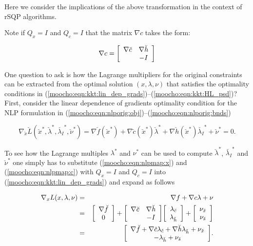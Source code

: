 \documentclass[pdf,ps2pdf,11pt]{SANDreport}
\begin{document}
{Here we consider the implications of the above transformation in the context of
rSQP algorithms.

Note if $Q_x = I$ and $Q_c = I$ that the matrix $\nabla c$ takes the form:

\begin{equation}
\nabla c = {\bmat{cc} \nabla \breve{c} & \nabla \breve{h} \\ & -I \emat}
	\label{moocho:eqn:Gc_orig}
\end{equation}

One question to ask is how the Lagrange multipliers for
the original constraints can be extracted from the optimal solution
$(x,\lambda,\nu)$ that satisfies the optimality conditions
in (\ref{moocho:eqn:kkt:lin_dep_grads})--(\ref{moocho:eqn:kkt:HL_psd})?
First, consider the linear dependence of gradients optimality condition
for the NLP formulation in (\ref{moocho:eqn:nlporig:obj})--(\ref{moocho:eqn:nlporig:bnds})

\begin{equation}
\nabla_{\breve{x}} \breve{L}(\breve{x}^*,\breve{\lambda}^*,\breve{\lambda_I}^*,\breve{\nu}^*)
= \nabla \breve{f}(\breve{x}^*) + \nabla \breve{c}(\breve{x}^*) \breve{\lambda}^*
+ \nabla \breve{h}(\breve{x}^*) \breve{\lambda_I}^* + \breve{\nu}^* = 0.
\label{moocho:eqn:kktorig:lin_dep_grads}
\end{equation}

To see how the Lagrange multiples $\lambda^*$ and $\nu^*$ can be used to compute
$\breve{\lambda}^*$, $\breve{\lambda_I}^*$ and $\breve{\nu}^*$ one simply has
to substitute (\ref{moocho:eqn:nlpmap:x}) and (\ref{moocho:eqn:nlpmap:c})
with $Q_x = I$ and $Q_c = I$ into (\ref{moocho:eqn:kkt:lin_dep_grads})
and expand as follows

\begin{eqnarray}
\nabla_{x} L(x,\lambda,\nu)
 & = & \nabla f + \nabla c \lambda + \nu \nonumber \\
 & = & {\bmat{c} \nabla \breve{f} \\ 0 \emat}
     + {\bmat{cc} \nabla \breve{c} & \nabla \breve{h} \\ & -I \emat}
       {\bmat{c} \lambda_{\breve{c}} \\ \lambda_{\breve{h}} \emat}
     + {\bmat{c} \nu_{\breve{x}} \\ \nu_{\breve{s}} \emat}
	\nonumber \\
 & = & {\bmat{c}
	\nabla \breve{f} + \nabla \breve{c} \lambda_{\breve{c}} + \nabla \breve{h} \lambda_{\breve{h}} + \nu_{\breve{x}} \\
	-\lambda_{\breve{h}} + \nu_{\breve{s}}
	\emat}.
	\label{moocho:eqn:kkt:compare_lagr}
\end{eqnarray}

}
\end{document}
